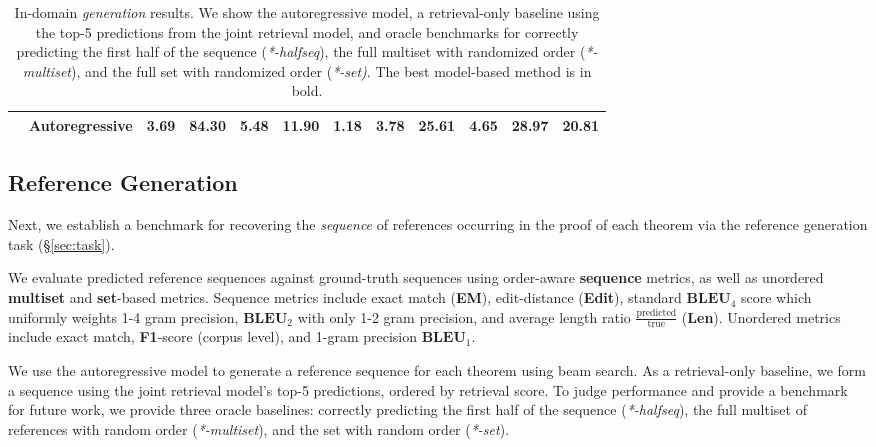 \begin{table}[t]
\begin{center}
\begin{tabular}{rrrrrrrrrrrr}
&Autoregressive& \textbf{3.69} & \textbf{84.30} & \textbf{5.48} & \textbf{11.90} & \textbf{1.18} & \textbf{3.78} & \textbf{25.61} & \textbf{4.65} & 28.97 & \textbf{20.81}\\
\bottomrule
\end{tabular}
\end{center}
\caption{
    In-domain \textit{generation} results.
    We show the autoregressive model, a retrieval-only baseline using the top-5 predictions from the joint retrieval model,
    and oracle benchmarks for correctly predicting the first half of the sequence (\textit{*-halfseq}), the full multiset with randomized order (\textit{*-multiset}), and the full set with randomized order (\textit{*-set)}.
    The best model-based method is  in bold.
}
\label{tbl:generation}
\end{table}

\subsection{Reference Generation}
\label{ssec:refgen}
Next, we establish a benchmark for recovering the \textit{sequence} of references occurring in the proof of each theorem via the reference generation task (\S\ref{sec:task}).

 We evaluate predicted reference sequences against ground-truth sequences using order-aware \textbf{sequence} metrics, as well as unordered \textbf{multiset} and \textbf{set}-based metrics. 
Sequence metrics include exact match (\textbf{EM}), edit-distance (\textbf{Edit}), standard $\textbf{BLEU}_4$ score which uniformly weights 1-4 gram precision, $\textbf{BLEU}_2$ with only 1-2 gram precision,
and average length ratio $\frac{\text{predicted}}{\text{true}}$ (\textbf{Len}).
Unordered metrics include exact match, \textbf{F1}-score (corpus level), and 1-gram precision $\textbf{BLEU}_1$.

 We use the autoregressive model to generate a reference sequence for each theorem using beam search.
As a retrieval-only baseline, we form a sequence using the joint retrieval model's top-5 predictions, ordered by retrieval score.
To judge performance and provide a benchmark for future work, we provide three oracle baselines: correctly predicting the first half of the sequence (\textit{*-halfseq}), the full multiset of references with random order (\textit{*-multiset}), and the set with random order (\textit{*-set}).

